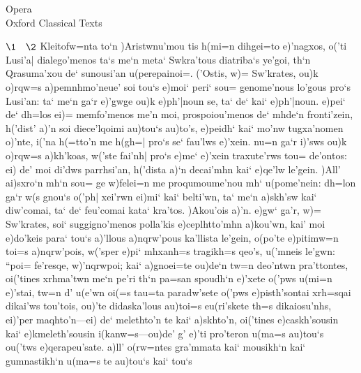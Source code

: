 \documentclass[11pt]{book}
\newcommand {\Spag} {\Npag*{=+1}\Npar{1}\numerus{1}}
\newcommand {\Spar} {\Npar*{=+1}\numerus{1}}
\newcommand {\Stephanus} [2]{%
\stephanus{St. \ROMANnumeral{#1}\\p. #2}\leavevmode\Npag{#2}%
}
\begin{document}
                 {Opera\\[.5ex] Oxford Classical Texts}

\pagestyle {MainMatterPage} 

\newpage
{}
\drama


\prosa 
{}
\Stephanus{3}{406} \(\1 \quad \2\)
%
\1 \Spar Kleitofw=nta to`n )Aristwnu'mou tis h(mi=n dihgei=to e)'nagxos, o('ti
Lusi'a| dialego'menos ta`s me`n meta` Swkra'tous diatriba`s ye'goi, th`n
Qrasuma'xou de` sunousi'an u(perepainoi=.            
%
\2 ('Ostis, w)= Sw'krates, ou)k o)rqw=s a)pemnhmo'neue' soi tou`s e)moi`
peri` sou= genome'nous lo'gous pro`s Lusi'an: ta` me`n ga`r e)'gwge ou)k
e)ph'|noun se, ta` de` kai` e)ph'|noun. e)pei` de` dh=los ei)= memfo'menos
me'n moi, prospoiou'menos de` mhde`n fronti'zein, h('dist' a)'n soi
diece'lqoimi au)tou`s au)to's, e)peidh` kai` mo'nw tugxa'nomen o)'nte,
i('na h(=tto'n me h(gh=| pro`s se` fau'lws e)'xein. nu=n ga`r i)'sws ou)k
o)rqw=s a)kh'koas, w('ste fai'nh| pro`s e)me` e)'xein traxute'rws tou=
de'ontos: ei) de' moi di'dws parrhsi'an, h('dista a)`n decai'mhn kai`
e)qe'lw le'gein. 
%
%
\1 \Spag )All' ai)sxro`n mh`n sou= ge w)felei=n me proqumoume'nou mh` u(pome'nein:
dh=lon ga`r w(s gnou`s o('ph| xei'rwn ei)mi` kai` belti'wn, ta` me`n
a)skh'sw kai` diw'comai, ta` de` feu'comai kata` kra'tos.
\2  )Akou'ois a)'n. e)gw` ga'r, w)= Sw'krates, soi` suggigno'menos polla'kis
e)ceplhtto'mhn a)kou'wn, kai' moi e)do'keis para` tou`s a)'llous
a)nqrw'pous ka'llista le'gein, o(po'te e)pitimw=n toi=s a)nqrw'pois,
w('sper e)pi` mhxanh=s tragikh=s qeo's, u('mneis 
%
%
 le'gwn: \Spar``poi= fe'resqe, w)'nqrwpoi; kai` a)gnoei=te ou)de`n tw=n
deo'ntwn pra'ttontes, oi('tines xrhma'twn me`n pe'ri th`n pa=san spoudh`n
e)'xete o('pws u(mi=n e)'stai, tw=n d' u(e'wn oi(=s tau=ta paradw'sete
o('pws e)pisth'sontai xrh=sqai dikai'ws tou'tois, ou)'te didaska'lous
au)toi=s eu(ri'skete th=s dikaiosu'nhs, ei)'per maqhto'n---ei) de`
melethto'n te kai` a)skhto'n, oi('tines e)caskh'sousin kai`
e)kmeleth'sousin i(kanw=s---ou)de' g' e)'ti pro'teron u(ma=s au)tou`s
ou('tws e)qerapeu'sate. a)ll' o(rw=ntes gra'mmata
%
%
 kai`\Spar{} mousikh`n kai` gumnastikh`n u(ma=s te au)tou`s kai` tou`s
\end{document}
